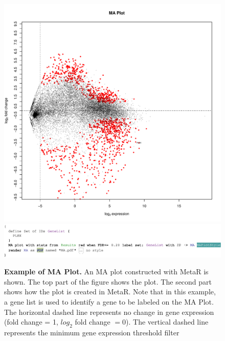   \begin{figure}[bpt!]
  \centering
  \includegraphics[width=\figWidthNarrow]{figures/MAPlot-1.pdf}
   \includegraphics[width=\figWidthWide]{figures/MAPlotConstruction-1.pdf}
\caption[Example of MA Plot.]{\textbf{Example of MA Plot.} An MA plot constructed with MetaR is shown. The top part of the figure shows the plot. The second part shows how the plot is created in MetaR. Note that in this example, a gene list is used to identify a gene to be labeled on the MA Plot. The horizontal dashed line represents no change in gene expression (fold change = 1, $log_2$ fold change $=0$). The vertical dashed line represents the minimum gene expression threshold filter}
\label{fig:MAPlot}
\end{figure}
